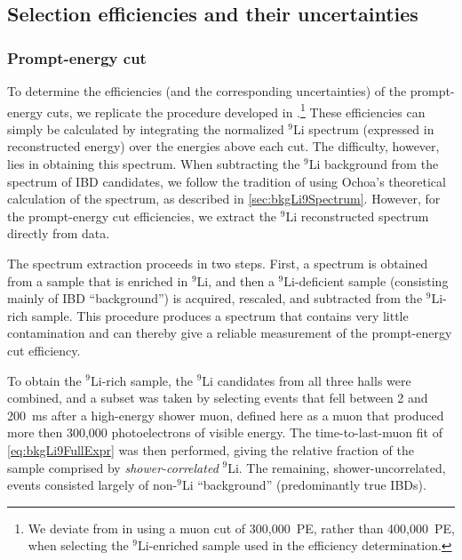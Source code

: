\documentclass[../thesis.tex]{subfiles}
\begin{document}
\subsection{Selection efficiencies and their uncertainties}
\label{sec:bkgLi9SelEffs}

\subsubsection{Prompt-energy cut}
\label{sec:bkgLi9PromptCutEff}

To determine the efficiencies (and the corresponding uncertainties) of the prompt-energy cuts, we replicate the procedure developed in \cite{ChrisLi9}.\footnote{We deviate from \cite{ChrisLi9} in using a muon cut of 300,000~PE, rather than 400,000~PE, when selecting the $^9$Li-enriched sample used in the efficiency determination.} These efficiencies can simply be calculated by integrating the normalized $^9$Li spectrum (expressed in reconstructed energy) over the energies above each cut. The difficulty, however, lies in obtaining this spectrum. When subtracting the $^9$Li background from the spectrum of IBD candidates, we follow the tradition of using Ochoa's theoretical calculation of the spectrum, as described in \autoref{sec:bkgLi9Spectrum}. However, for the prompt-energy cut efficiencies, we extract the $^9$Li reconstructed spectrum directly from data.

The spectrum extraction proceeds in two steps. First, a spectrum is obtained from a sample that is enriched in $^9$Li, and then a $^9$Li-deficient sample (consisting mainly of IBD ``background'') is acquired, rescaled, and subtracted from the $^9$Li-rich sample. This procedure produces a spectrum that contains very little contamination and can thereby give a reliable measurement of the prompt-energy cut efficiency.

To obtain the $^9$Li-rich sample, the $^9$Li candidates from all three halls were combined, and a subset was taken by selecting events that fell between 2 and 200~ms after a high-energy shower muon, defined here as a muon that produced more then 300,000 photoelectrons of visible energy. The time-to-last-muon fit of \autoref{eq:bkgLi9FullExpr} was then performed, giving the relative fraction of the sample comprised by \emph{shower-correlated} $^9$Li. The remaining, shower-uncorrelated, events consisted largely of non-$^9$Li ``background'' (predominantly true IBDs).
\end{document}
